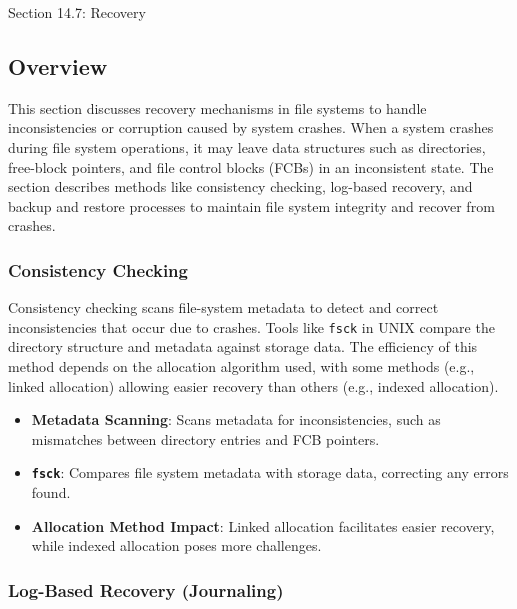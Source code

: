 \begin{notes}{Section 14.7: Recovery}
    \subsection*{Overview}

    This section discusses recovery mechanisms in file systems to handle inconsistencies or corruption caused by system crashes. When a system crashes during file system operations, it may leave data 
    structures such as directories, free-block pointers, and file control blocks (FCBs) in an inconsistent state. The section describes methods like consistency checking, log-based recovery, and backup 
    and restore processes to maintain file system integrity and recover from crashes.
    
    \subsubsection*{Consistency Checking}
    
    Consistency checking scans file-system metadata to detect and correct inconsistencies that occur due to crashes. Tools like \texttt{fsck} in UNIX compare the directory structure and metadata against 
    storage data. The efficiency of this method depends on the allocation algorithm used, with some methods (e.g., linked allocation) allowing easier recovery than others (e.g., indexed allocation).
    
    \begin{highlight}
    
        \begin{itemize}
            \item \textbf{Metadata Scanning}: Scans metadata for inconsistencies, such as mismatches between directory entries and FCB pointers.
            \item \textbf{\texttt{fsck}}: Compares file system metadata with storage data, correcting any errors found.
            \item \textbf{Allocation Method Impact}: Linked allocation facilitates easier recovery, while indexed allocation poses more challenges.
        \end{itemize}
    
    \end{highlight}
    
    \subsubsection*{Log-Based Recovery (Journaling)}
    

\end{notes}
